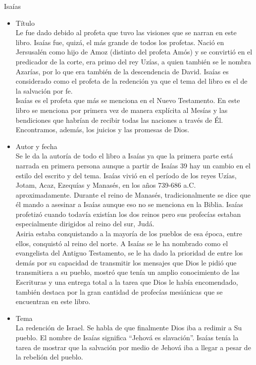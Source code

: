 %
%
\begin{section}{Isaías}
	\begin{itemize}
		\item Título\\
			Le fue dado debido al profeta que tuvo las visiones que se narran en este libro. Isaías fue, quizá, el más grande de todos los profetas. Nació en Jersusalén como hijo de Amoz (distinto del profeta Amós) y se convirtió en el predicador de la corte, era primo del rey Uzías, a quien también se le nombra Azarías, por lo que era también de la descendencia de David. Isaías es considerado como el profeta de la redención ya que el tema del libro es el de la salvación por fe.\\
			Isaías es el profeta que más se menciona en el Nuevo Testamento. En este libro se menciona por primera vez de manera explícita al Mesías y las bendiciones que habrían de recibir todas las naciones a través de Él. Encontramos, además, los juicios y las promesas de Dios.
		\item Autor y fecha\\
			Se le da la autoría de todo el libro a Isaías ya que la primera parte está narrada en primera persona aunque a partir de Isaías 39 hay un cambio en el estilo del escrito y del tema. Isaías vivió en el período de los reyes Uzías, Jotam, Acaz, Ezequías y Manasés, en los años 739-686 a.C. aproximadamente. Durante el reino de Manasés, tradicionalmente se dice que él mando a asesinar a Isaías aunque eso no se menciona en la Biblia. Isaías profetizó cuando todavía existían los dos reinos pero sus profecías estaban especialmente dirigidos al reino del sur, Judá. \\
			Asiria estaba conquistando a la mayoría de los pueblos de esa época, entre ellos, conquistó al reino del norte. A Isaías se le ha nombrado como el evangelista del Antiguo Testamento, se le ha dado la prioridad de entre los demás por su capacidad de transmitir los mensajes que Dios le pidió que transmitiera a su pueblo, mostró que tenía un amplio conocimiento de las Escrituras y una entrega total a la tarea que Dios le había encomendado, también destaca por la gran cantidad de profecías mesiánicas que se encuentran en este libro.
		\item Tema\\
			La redención de Israel. Se habla de que finalmente Dios iba a redimir a Su pueblo. El nombre de Isaías significa ``Jehová es slavación''. Isaías tenía la tarea de mostrar que la salvación por medio de Jehová iba a llegar a pesar de la rebelión del pueblo.\\

\end{itemize}
\end{section}
